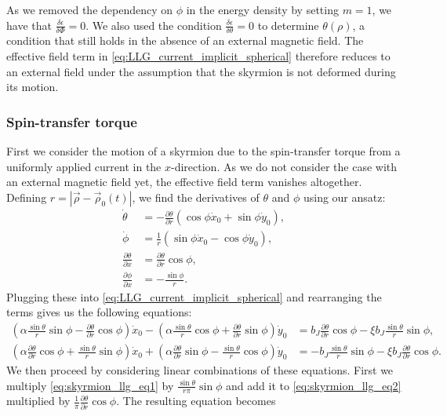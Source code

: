\documentclass[12pt, a4paper, twoside, openright]{article}		%
\numberwithin{equation}{section}
\begin{document}
As we removed the dependency on $\phi$ in the energy density by setting $m=1$, we have that $\frac{\delta \epsilon}{\delta \Phi} = 0$. We also used the condition $\frac{\delta\epsilon}{\delta\theta}=0$ to determine $\theta(\rho)$, a condition that still holds in the absence of an external magnetic field. The effective field term in \eqref{eq:LLG_current_implicit_spherical} therefore reduces to an external field under the assumption that the skyrmion is not deformed during its motion.

\subsubsection{Spin-transfer torque}
First we consider the motion of a skyrmion due to the spin-transfer torque from a uniformly applied current in the $x$-direction. As we do not consider the case with an external magnetic field yet, the effective field term vanishes altogether. Defining $r = |\vec{\rho}-\vec{\rho}_0(t)|$, we find the derivatives of $\theta$ and $\phi$ using our ansatz:
\begin{align}
\dot{\theta} &= -\frac{\partial\theta}{\partial r}(\cos\phi\dot{x}_0+\sin\phi\dot{y}_0), \\
\dot{\phi} &= \frac{1}{r}(\sin\phi\dot{x}_0-\cos\phi\dot{y}_0), \\
\frac{\partial \theta}{\partial x} &= \frac{\partial\theta}{\partial r} \cos\phi,\\
\frac{\partial\phi}{\partial x} &= -\frac{\sin\phi}{r}.
\end{align}
Plugging these into \eqref{eq:LLG_current_implicit_spherical} and rearranging the terms gives us the following equations:
\begin{align}
\left(\alpha\frac{\sin\theta}{r}\sin\phi-\frac{\partial\theta}{\partial r}\cos\phi\right)\dot{x}_0 - \left(\alpha\frac{\sin\theta}{r}\cos\phi+\frac{\partial\theta}{\partial r}\sin\phi\right)\dot{y}_0 &= b_J \frac{\partial\theta}{\partial r}\cos\phi - \xi b_J \frac{\sin\theta}{r}\sin\phi, \label{eq:skyrmion_llg_eq1}\\
\left(\alpha\frac{\partial\theta}{\partial r}\cos\phi + \frac{\sin\theta}{r}\sin\phi\right)\dot{x}_0 + \left(\alpha\frac{\partial\theta}{\partial r}\sin\phi - \frac{\sin\theta}{r}\cos\phi\right)\dot{y}_0 &= -b_J\frac{\sin\theta}{r}\sin\phi - \xi b_J \frac{\partial\theta}{\partial r}\cos\phi. \label{eq:skyrmion_llg_eq2}
\end{align}
We then proceed by considering linear combinations of these equations. First we multiply \eqref{eq:skyrmion_llg_eq1} by $\frac{\sin\theta}{r \pi}\sin\phi$ and add it to \eqref{eq:skyrmion_llg_eq2} multiplied by $\frac{1}{\pi}\frac{\partial\theta}{\partial r}\cos\phi$. The resulting equation becomes
\end{document}
